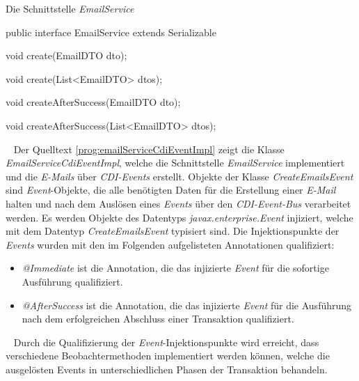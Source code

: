 \begin{program}
\caption{Die Schnittstelle \emph{EmailService}}
\label{prog:emailService}
\begin{JavaCode}
public interface EmailService extends Serializable {

    void create(EmailDTO dto);

    void create(List<EmailDTO> dtos);

    void createAfterSuccess(EmailDTO dto);

    void createAfterSuccess(List<EmailDTO> dtos);
    
}
\end{JavaCode}
\end{program}
\ \newline
Der Quelltext \ref{prog:emailServiceCdiEventImpl} zeigt die Klasse \emph{EmailServiceCdiEventImpl}, welche die Schnittstelle \emph{EmailService} implementiert und die \emph{E-Mails} über \emph{CDI-Events} erstellt. 
\newline
\newline
Objekte der Klasse \emph{CreateEmailsEvent} sind \emph{Event}-Objekte, die alle benötigten Daten für die Erstellung einer \emph{E-Mail} halten und nach dem Auslösen eines \emph{Events} über den \emph{CDI-Event-Bus} verarbeitet werden. 
\newline
\newline
Es werden Objekte des Datentyps \emph{javax.enterprise.Event} injiziert, welche mit dem Datentyp \emph{CreateEmailsEvent} typisiert sind. Die Injektionspunkte der \emph{Events} wurden mit den im Folgenden aufgelisteten Annotationen qualifiziert:
\begin{itemize}
	\item\emph{@Immediate} ist die Annotation, die das injizierte \emph{Event} für die sofortige Ausführung qualifiziert.
	\item\emph{@AfterSuccess} ist die Annotation, die das injizierte \emph{Event} für die Ausführung nach dem erfolgreichen Abschluss einer Transaktion qualifiziert.
\end{itemize}
\ \newline
Durch die Qualifizierung der \emph{Event}-Injektionspunkte wird erreicht, dass verschiedene Beobachtermethoden implementiert werden können, welche die ausgelösten Events in unterschiedlichen Phasen der Transaktion behandeln.
\newpage

